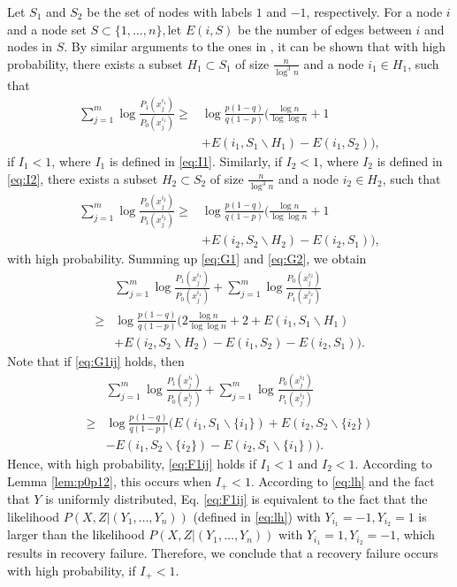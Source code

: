 \documentclass[conference]{IEEEtran}
\begin{document}
		Let $S_1$ and $S_2$ be the set of nodes with labels $1$ and $-1$, respectively. For a node $i$ and a node set $S\subset\{1,\ldots,n\}, $let $E(i,S)$ be the number of edges between $i$ and nodes in $S$.
		By similar arguments to the ones in \cite{abbe2015exact}, it can be shown that with high probability, there exists a subset
		 $H_1\subset S_1$ of size $\frac{n}{\log^3 n}$ and a node $i_1\in H_1$, such that  
		\begin{align}
			\sum_{j=1}^{m} \log \frac{P_1(x^{i_1}_{j})}{P_0(x^{i_1}_{j})}
			\ge &\log \frac{p(1-q)}{q(1-p)}\Big(\frac{\log n}{\log\log n}+1\nonumber\\
			&+E(i_1, S_1 \backslash H_1) - E(i_1, S_2) \Big) \label{eq:G1},
		\end{align}	
	if $I_1<1$, where $I_1$ is defined in \eqref{eq:I1}. Similarly, if $I_2<1$, where $I_2$ is defined in \eqref{eq:I2}, there exists a subset
		$H_2\subset S_2$ of size $\frac{n}{\log^3 n}$ and a node $i_2\in H_2$, such that  
		\begin{align}
			\sum_{j=1}^{m} \log \frac{P_0(x^{i_2}_{j})}{P_1(x^{i_2}_{j})}
			\ge &\log \frac{p(1-q)}{q(1-p)}\Big(\frac{\log n}{\log\log n}+1\nonumber\\
			&+E(i_2, S_2 \backslash H_2) - E(i_2, S_1) \Big) \label{eq:G2},
		\end{align}	
	with high probability. Summing up \eqref{eq:G1} and \eqref{eq:G2}, we obtain	
		\begin{align}
			&\sum_{j=1}^{m} \log \frac{P_1(x^{i_1}_{j})}{P_0(x^{i_1}_{j})}
			+\sum_{j=1}^{m} \log \frac{P_0(x^{i_2}_{j})}{P_1(x^{i_2}_{j})}\nonumber\\    
			\ge &\log \frac{p(1-q)}{q(1-p)}\Big(2\frac{\log n}{\log\log n}+2+E(i_1, S_1 \backslash H_1) \nonumber\\
			&+ E(i_2, S_2 \backslash H_2)- E(i_1, S_2 ) - E(i_2, S_1 )\Big) \label{eq:G1ij}.
		\end{align}	
		Note that if \eqref{eq:G1ij} holds, then
		\begin{align}
			&\sum_{j=1}^{m} \log \frac{P_1(x^{i_1}_{j})}{P_0(x^{i_1}_{j})}
			+\sum_{j=1}^{m} \log \frac{P_0(x^{i_2}_{j})}{P_1(x^{i_2}_{j})}\nonumber\\
			\ge &\log \frac{p(1-q)}{q(1-p)}(E(i_1, S_1 \backslash \{i_1\}) + E(i_2, S_2 \backslash \{i_2\})\nonumber\\
			&- E(i_1, S_2 \backslash \{i_2\}) - E(i_2, S_1 \backslash \{i_1\})) \label{eq:F1ij}.
		\end{align}
		Hence, with high probability, \eqref{eq:F1ij} holds if $I_1<1$ and $I_2<1$. According to Lemma \ref{lem:p0p12}, this occurs when $I_+<1$. According to \eqref{eq:lh} and the fact that $Y$ is uniformly distributed, Eq. \eqref{eq:F1ij} is equivalent to the fact that the likelihood $P(X,Z|(Y_1,\ldots,Y_n))$ (defined in \eqref{eq:lh}) with $Y_{i_1}=-1,Y_{i_2}=1$ is larger than the likelihood $P(X,Z|(Y_1,\ldots,Y_n))$ with $Y_{i_1}=1,Y_{i_2}=-1$, which results in  recovery failure. Therefore, we conclude that a recovery failure occurs with high probability, if $I_+<1$.  
\end{document}

